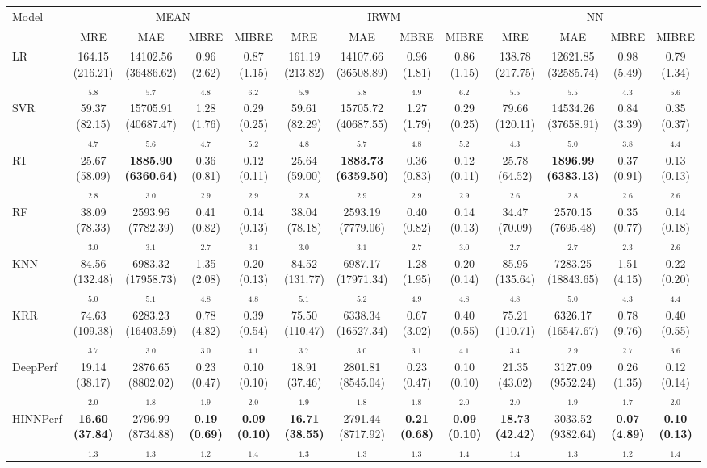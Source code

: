 \begin{tabular}{lcccccccccccc}
\toprule
Model & \multicolumn{4}{c}{MEAN} & \multicolumn{4}{c}{IRWM} & \multicolumn{4}{c}{NN} \\
& MRE & MAE & MBRE & MIBRE & MRE & MAE & MBRE & MIBRE & MRE & MAE & MBRE & MIBRE \\
\midrule
LR & 164.15 (216.21)$_{5.8}$ & 14102.56 (36486.62)$_{5.7}$ & 0.96 (2.62)$_{4.8}$ & 0.87 (1.15)$_{6.2}$ & 161.19 (213.82)$_{5.9}$ & 14107.66 (36508.89)$_{5.8}$ & 0.96 (1.81)$_{4.9}$ & 0.86 (1.15)$_{6.2}$ & 138.78 (217.75)$_{5.5}$ & 12621.85 (32585.74)$_{5.5}$ & 0.98 (5.49)$_{4.3}$ & 0.79 (1.34)$_{5.6}$ \\
SVR & 59.37 (82.15)$_{4.7}$ & 15705.91 (40687.47)$_{5.6}$ & 1.28 (1.76)$_{4.7}$ & 0.29 (0.25)$_{5.2}$ & 59.61 (82.29)$_{4.8}$ & 15705.72 (40687.55)$_{5.7}$ & 1.27 (1.79)$_{4.8}$ & 0.29 (0.25)$_{5.2}$ & 79.66 (120.11)$_{4.3}$ & 14534.26 (37658.91)$_{5.0}$ & 0.84 (3.39)$_{3.8}$ & 0.35 (0.37)$_{4.4}$ \\
RT & 25.67 (58.09)$_{2.8}$ & \textbf{1885.90 (6360.64)$_{3.0}$} & 0.36 (0.81)$_{2.9}$ & 0.12 (0.11)$_{2.9}$ & 25.64 (59.00)$_{2.8}$ & \textbf{1883.73 (6359.50)$_{2.9}$} & 0.36 (0.83)$_{2.9}$ & 0.12 (0.11)$_{2.9}$ & 25.78 (64.52)$_{2.6}$ & \textbf{1896.99 (6383.13)$_{2.8}$} & 0.37 (0.91)$_{2.6}$ & 0.13 (0.13)$_{2.6}$ \\
RF & 38.09 (78.33)$_{3.0}$ & 2593.96 (7782.39)$_{3.1}$ & 0.41 (0.82)$_{2.7}$ & 0.14 (0.13)$_{3.1}$ & 38.04 (78.18)$_{3.0}$ & 2593.19 (7779.06)$_{3.1}$ & 0.40 (0.82)$_{2.7}$ & 0.14 (0.13)$_{3.0}$ & 34.47 (70.09)$_{2.7}$ & 2570.15 (7695.48)$_{2.7}$ & 0.35 (0.77)$_{2.3}$ & 0.14 (0.18)$_{2.6}$ \\
KNN & 84.56 (132.48)$_{5.0}$ & 6983.32 (17958.73)$_{5.1}$ & 1.35 (2.08)$_{4.8}$ & 0.20 (0.13)$_{4.8}$ & 84.52 (131.77)$_{5.1}$ & 6987.17 (17971.34)$_{5.2}$ & 1.28 (1.95)$_{4.9}$ & 0.20 (0.14)$_{4.8}$ & 85.95 (135.64)$_{4.8}$ & 7283.25 (18843.65)$_{5.0}$ & 1.51 (4.15)$_{4.3}$ & 0.22 (0.20)$_{4.4}$ \\
KRR & 74.63 (109.38)$_{3.7}$ & 6283.23 (16403.59)$_{3.0}$ & 0.78 (4.82)$_{3.0}$ & 0.39 (0.54)$_{4.1}$ & 75.50 (110.47)$_{3.7}$ & 6338.34 (16527.34)$_{3.0}$ & 0.67 (3.02)$_{3.1}$ & 0.40 (0.55)$_{4.1}$ & 75.21 (110.71)$_{3.4}$ & 6326.17 (16547.67)$_{2.9}$ & 0.78 (9.76)$_{2.7}$ & 0.40 (0.55)$_{3.6}$ \\
DeepPerf & 19.14 (38.17)$_{2.0}$ & 2876.65 (8802.02)$_{1.8}$ & 0.23 (0.47)$_{1.9}$ & 0.10 (0.10)$_{2.0}$ & 18.91 (37.46)$_{1.9}$ & 2801.81 (8545.04)$_{1.8}$ & 0.23 (0.47)$_{1.8}$ & 0.10 (0.10)$_{2.0}$ & 21.35 (43.02)$_{2.0}$ & 3127.09 (9552.24)$_{1.9}$ & 0.26 (1.35)$_{1.7}$ & 0.12 (0.14)$_{2.0}$ \\
HINNPerf & \textbf{16.60 (37.84)$_{1.3}$} & 2796.99 (8734.88)$_{1.3}$ & \textbf{0.19 (0.69)$_{1.2}$} & \textbf{0.09 (0.10)$_{1.4}$} & \textbf{16.71 (38.55)$_{1.3}$} & 2791.44 (8717.92)$_{1.3}$ & \textbf{0.21 (0.68)$_{1.3}$} & \textbf{0.09 (0.10)$_{1.4}$} & \textbf{18.73 (42.42)$_{1.4}$} & 3033.52 (9382.64)$_{1.3}$ & \textbf{0.07 (4.89)$_{1.2}$} & \textbf{0.10 (0.13)$_{1.4}$} \\
\bottomrule
\end{tabular}
